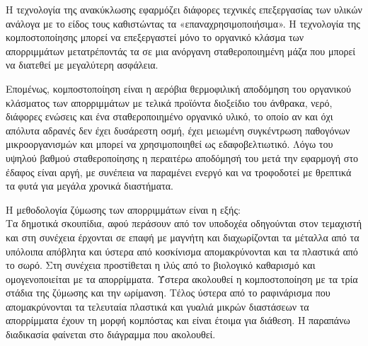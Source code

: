 \documentclass[12pt]{article}
\begin{document}
 	Η τεχνολογία της ανακύκλωσης εφαρμόζει διάφορες τεχνικές επεξεργασίας των υλικών ανάλογα με το είδος τους καθιστώντας τα «επαναχρησιμοποιήσιμα». Η τεχνολογία της κομποστοποίησης μπορεί να επεξεργαστεί μόνο το οργανικό κλάσμα των απορριμμάτων μετατρέποντάς τα σε μια ανόργανη σταθεροποιημένη μάζα που μπορεί να διατεθεί με μεγαλύτερη ασφάλεια.
 	
 	Επομένως, κομποστοποίηση είναι η αερόβια θερμοφιλική αποδόμηση του οργανικού κλάσματος των απορριμμάτων με τελικά προϊόντα διοξείδιο του άνθρακα, νερό, διάφορες ενώσεις και ένα σταθεροποιημένο οργανικό υλικό, το οποίο αν και όχι απόλυτα αδρανές δεν έχει δυσάρεστη οσμή, έχει μειωμένη συγκέντρωση παθογόνων μικροοργανισμών και μπορεί να χρησιμοποιηθεί ως εδαφοβελτιωτικό. Λόγω του υψηλού βαθμού σταθεροποίησης η περαιτέρω αποδόμησή του μετά την εφαρμογή στο έδαφος είναι αργή, με συνέπεια να παραμένει ενεργό και να τροφοδοτεί με θρεπτικά τα φυτά για μεγάλα χρονικά διαστήματα.
 	
 	Η μεθοδολογία ζύμωσης των απορριμμάτων είναι η εξής:  \\
 	Τα δημοτικά σκουπίδια, αφού περάσουν από τον υποδοχέα οδηγούνται στον τεμαχιστή και στη συνέχεια έρχονται σε επαφή με μαγνήτη και διαχωρίζονται τα μέταλλα από τα υπόλοιπα απόβλητα και ύστερα από κοσκίνισμα απομακρύνονται και τα πλαστικά από το σωρό. Στη συνέχεια προστίθεται η ιλύς από το βιολογικό καθαρισμό και ομογενοποιείται με τα απορρίμματα.  Ύστερα ακολουθεί η κομποστοποίηση με τα τρία στάδια της ζύμωσης και την ωρίμανση. Τέλος ύστερα από το ραφινάρισμα που απομακρύνονται τα τελευταία πλαστικά και γυαλιά μικρών διαστάσεων τα απορρίμματα έχουν τη μορφή κομπόστας και είναι έτοιμα για διάθεση. Η παραπάνω διαδικασία φαίνεται στο διάγραμμα που ακολουθεί. 
 	
\end{document}
